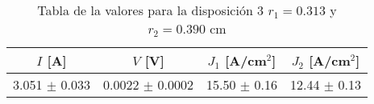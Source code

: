 \begin{table}[H]
    \centering
\begin{tabular}{cccc}
\toprule
$I$ [A] & $V$ [V] & $J_1$ [A/cm$^2$] & $J_2$ [A/cm$^2$] \\
\midrule
3.051 $\pm$ 0.033 & 0.0022 $\pm$ 0.0002 & 15.50 $\pm$ 0.16 & 12.44 $\pm$ 0.13 \\
\bottomrule
\end{tabular}
    \caption{Tabla de la valores para la disposición 3 $r_1=0.313$ y $r_2=0.390$ cm }
    \label{Tab:VIJ_mini_3}
\end{table}
